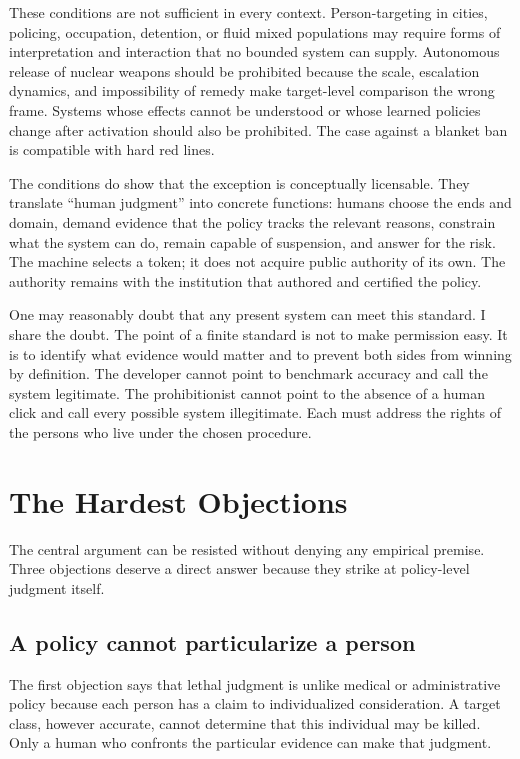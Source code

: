 \documentclass[11pt]{article}
\begin{document}
These conditions are not sufficient in every context. Person-targeting in cities, policing, occupation, detention, or fluid mixed populations may require forms of interpretation and interaction that no bounded system can supply. Autonomous release of nuclear weapons should be prohibited because the scale, escalation dynamics, and impossibility of remedy make target-level comparison the wrong frame. Systems whose effects cannot be understood or whose learned policies change after activation should also be prohibited. The case against a blanket ban is compatible with hard red lines.

The conditions do show that the exception is conceptually licensable. They translate ``human judgment'' into concrete functions: humans choose the ends and domain, demand evidence that the policy tracks the relevant reasons, constrain what the system can do, remain capable of suspension, and answer for the risk. The machine selects a token; it does not acquire public authority of its own. The authority remains with the institution that authored and certified the policy.

One may reasonably doubt that any present system can meet this standard. I share the doubt. The point of a finite standard is not to make permission easy. It is to identify what evidence would matter and to prevent both sides from winning by definition. The developer cannot point to benchmark accuracy and call the system legitimate. The prohibitionist cannot point to the absence of a human click and call every possible system illegitimate. Each must address the rights of the persons who live under the chosen procedure.

\section{The Hardest Objections}
\label{sec:objections}

The central argument can be resisted without denying any empirical premise. Three objections deserve a direct answer because they strike at policy-level judgment itself.

\subsection{A policy cannot particularize a person}

The first objection says that lethal judgment is unlike medical or administrative policy because each person has a claim to individualized consideration. A target class, however accurate, cannot determine that this individual may be killed. Only a human who confronts the particular evidence can make that judgment.
\end{document}

